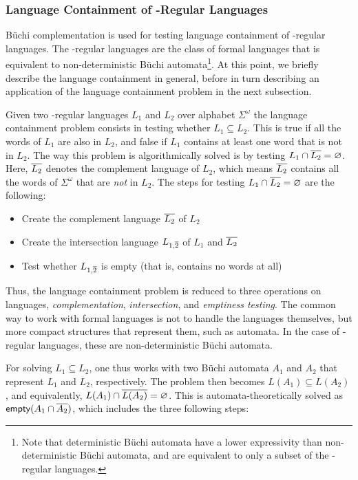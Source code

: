 \subsubsection{Language Containment of \om-Regular Languages}

Büchi complementation is used for testing language containment of \om-regular languages. The \om-regular languages are the class of formal languages that is equivalent to non-deterministic Büchi automata\footnote{Note that deterministic Büchi automata have a lower expressivity than non-deterministic Büchi automata, and are equivalent to only a subset of the \om-regular languages.}. At this point, we briefly describe the language containment in general, before in turn describing an application of the language containment problem in the next subsection.

Given two \om-regular languages $L_1$ and $L_2$ over alphabet $\Sigma^\omega$ the language containment problem consists in testing whether $L_1 \subseteq L_2$. This is true if all the words of $L_1$ are also in $L_2$, and false if $L_1$ contains at least one word that is not in $L_2$. The way this problem is algorithmically solved is by testing $L_1 \cap \cl1{L_2} = \varnothing$. Here, $\cl1{L_2}$ denotes the complement language of $L_2$, which means $\cl1{L_2}$ contains all the words of $\Sigma^\omega$ that are \textit{not} in $L_2$. The steps for testing $L_1 \cap \cl1{L_2} = \varnothing$ are the following:

\begin{itemize}
\item Create the complement language $\cl1{L_2}$ of $L_2$
\item Create the intersection language $L_{1,\cl1{2}}$ of $L_1$ and $\cl1{L_2}$
\item Test whether $L_{1,\cl1{2}}$ is empty (that is, contains no words at all)
\end{itemize}

Thus, the language containment problem is reduced to three operations on languages, \textit{complementation}, \textit{intersection}, and \textit{emptiness testing}. The common way to work with formal languages is not to handle the languages themselves, but more compact structures that represent them, such as automata. In the case of \om-regular languages, these are non-deterministic Büchi automata.

For solving $L_1 \subseteq L_2$, one thus works with two Büchi automata $A_1$ and $A_2$ that represent $L_1$ and $L_2$, respectively. The problem then becomes $L(A_1) \subseteq L(A_2)$, and equivalently, $L(A_1) \cap \cl1{L(A_2)} = \varnothing$. This is automata-theoretically solved as $\text{\textsf{empty}}(A_1 \cap \cl1{A_2})$, which includes the three following steps:

